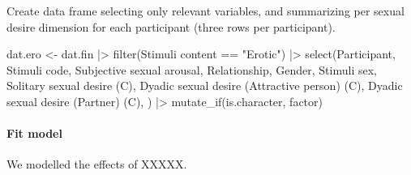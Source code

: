 \documentclass[
  bookmarksnumbered]{article}
\newenvironment{Shaded}{\begin{snugshade}}{\end{snugshade}}
\newcommand{\AttributeTok}[1]{\textcolor[rgb]{0.80,0.80,0.80}{#1}}
\newcommand{\FunctionTok}[1]{\textcolor[rgb]{0.94,0.94,0.56}{#1}}
\newcommand{\NormalTok}[1]{\textcolor[rgb]{0.80,0.80,0.80}{#1}}
\newcommand{\OtherTok}[1]{\textcolor[rgb]{0.94,0.94,0.56}{#1}}
\newcommand{\SpecialCharTok}[1]{\textcolor[rgb]{0.86,0.64,0.64}{#1}}
\newcommand{\StringTok}[1]{\textcolor[rgb]{0.80,0.58,0.58}{#1}}
\begin{document}
Create data frame selecting only relevant variables, and summarizing per sexual desire dimension for each participant (three rows per participant).

\begin{Shaded}
\begin{Highlighting}[]
\NormalTok{dat.ero }\OtherTok{\textless{}{-}}\NormalTok{ dat.fin }\SpecialCharTok{|\textgreater{}}
  \FunctionTok{filter}\NormalTok{(}\StringTok{\textasciigrave{}}\AttributeTok{Stimuli content}\StringTok{\textasciigrave{}} \SpecialCharTok{==} \StringTok{"Erotic"}\NormalTok{)  }\SpecialCharTok{|\textgreater{}} 
  \FunctionTok{select}\NormalTok{(Participant, }\StringTok{\textasciigrave{}}\AttributeTok{Stimuli code}\StringTok{\textasciigrave{}}\NormalTok{, }
         \StringTok{\textasciigrave{}}\AttributeTok{Subjective sexual arousal}\StringTok{\textasciigrave{}}\NormalTok{, }
\NormalTok{         Relationship, }
\NormalTok{         Gender, }
         \StringTok{\textasciigrave{}}\AttributeTok{Stimuli sex}\StringTok{\textasciigrave{}}\NormalTok{, }
         \StringTok{\textasciigrave{}}\AttributeTok{Solitary sexual desire (C)}\StringTok{\textasciigrave{}}\NormalTok{,}
         \StringTok{\textasciigrave{}}\AttributeTok{Dyadic sexual desire (Attractive person) (C)}\StringTok{\textasciigrave{}}\NormalTok{, }
         \StringTok{\textasciigrave{}}\AttributeTok{Dyadic sexual desire (Partner) (C)}\StringTok{\textasciigrave{}}\NormalTok{, ) }\SpecialCharTok{|\textgreater{}} 
  \FunctionTok{mutate\_if}\NormalTok{(is.character, factor)}
\end{Highlighting}
\end{Shaded}

\hypertarget{fit-model-1}{%
\paragraph{Fit model}\label{fit-model-1}}

We modelled the effects of XXXXX.
\end{document}
